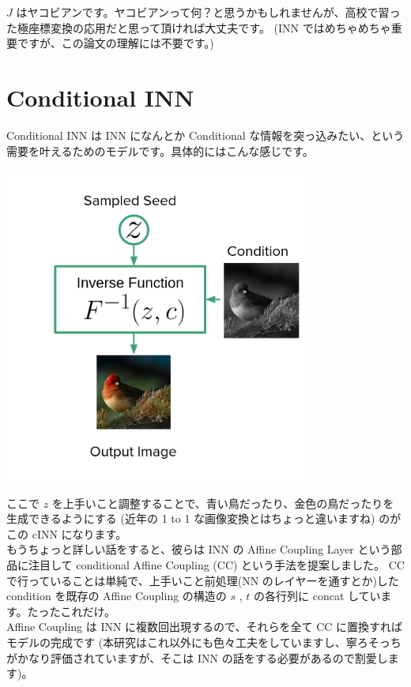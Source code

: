 \documentclass[a4paper, dvipdfmx, 10pt]{article}
\begin{document}
\(J\) はヤコビアンです。ヤコビアンって何？と思うかもしれませんが、高校で習った極座標変換の応用だと思って頂ければ大丈夫です。 (INN ではめちゃめちゃ重要ですが、この論文の理解には不要です。)\\

\section{Conditional INN}
\label{sec:org74d6502}
Conditional INN は INN になんとか Conditional な情報を突っ込みたい、という需要を叶えるためのモデルです。具体的にはこんな感じです。\\

\begin{center}
\includegraphics[width=10cm]{./img/cinn_over.png}
\end{center}


ここで \(z\) を上手いこと調整することで、青い鳥だったり、金色の鳥だったりを生成できるようにする (近年の 1 to 1 な画像変換とはちょっと違いますね) のがこの cINN になります。\\

もうちょっと詳しい話をすると、彼らは INN の Affine Coupling Layer という部品に注目して conditional Affine Coupling (CC) という手法を提案しました。 CC で行っていることは単純で、上手いこと前処理(NN のレイヤーを通すとか)した condition を既存の Affine Coupling の構造の \(s\) , \(t\) の各行列に concat しています。たったこれだけ。\\
Affine Coupling は INN に複数回出現するので、それらを全て CC に置換すればモデルの完成です (本研究はこれ以外にも色々工夫をしていますし、寧ろそっちがかなり評価されていますが、そこは INN の話をする必要があるので割愛します)。\\
\end{document}
